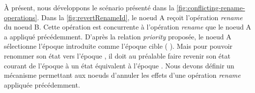 \label{sec:reverting-rename-ops}

À présent, nous développons le scénario présenté dans la \autoref{fig:conflicting-rename-operations}.
Dans la \autoref{fig:revertRenameId}, le noeud A reçoit l'opération \emph{rename} du noeud B.
Cette opération est concurrente à l'opération \emph{rename} que le noeud A a appliqué précédemment.
D'après la relation \emph{priority} proposée, le noeud A sélectionne l'époque introduite  comme l'époque cible ( \lepoch {}).
Mais pour pouvoir renommer son état vers l'époque , il doit au préalable faire revenir son état courant de l'époque  à un état équivalent à l'époque .
Nous devons définir un mécanisme permettant aux noeuds d'annuler les effets d'une opération \emph{rename} appliquée précédemment.

